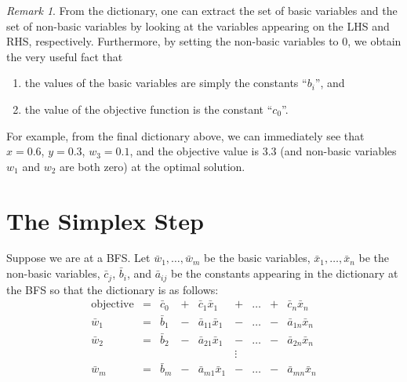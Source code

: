 \documentclass[
]{book}
\providecommand{\tightlist}{%
  \setlength{\itemsep}{0pt}\setlength{\parskip}{0pt}}
\theoremstyle{definition}
\theoremstyle{definition}
\theoremstyle{definition}
\theoremstyle{definition}
\theoremstyle{remark}
\newtheorem*{remark}{Remark}
\begin{document}
\begin{remark}
From the dictionary, one can extract the set of basic variables and the set of non-basic variables by looking at the variables appearing on the LHS and RHS, respectively. Furthermore, by setting the non-basic variables to 0, we obtain the very useful fact that

\begin{enumerate}
\def\labelenumi{\arabic{enumi}.}
\tightlist
\item
  the values of the basic variables are simply the constants ``\(b_i\)'', and
\item
  the value of the objective function is the constant ``\(c_0\)''.
\end{enumerate}

For example, from the final dictionary above, we can immediately see that \(x = 0.6\), \(y = 0.3\), \(w_3 = 0.1\), and the objective value is \(3.3%
\) (and non-basic variables \(w_1\) and \(w_2\) are both zero) at the optimal solution.
\end{remark}

\hypertarget{the-simplex-step}{%
\section{The Simplex Step}\label{the-simplex-step}}

Suppose we are at a BFS.
Let \(\bar{w}_1, \dots, \bar{w}_m\) be the basic variables, \(\bar{x}_1, \dots, \bar{x}_n\) be the non-basic variables, \(\bar{c}_j\), \(\bar{b}_i\), and \(\bar{a}_{ij}\) be the constants appearing in the dictionary at the BFS so that the dictionary is as follows:
\begin{equation}
  \begin{array}{rrrrrrrrrr}
  \mbox{objective} & = & \bar{c}_0 & + & \bar{c}_1\bar{x}_1 & + & \dots & + & \bar{c}_n\bar{x}_n \\
      \bar{w}_1 & = & \bar{b}_1 & - & \bar{a}_{11} \bar{x}_1 & - & \dots & - & \bar{a}_{1n} \bar{x}_n \\
      \bar{w}_2 & = & \bar{b}_2 & - & \bar{a}_{21} \bar{x}_1 & - & \dots & - & \bar{a}_{2n} \bar{x}_n \\
      & & & & & \vdots &  \\
      \bar{w}_m & = & \bar{b}_m & - & \bar{a}_{m1} \bar{x}_1 & - & \dots & - & \bar{a}_{mn} \bar{x}_n 
  \end{array} 
  \label{eq:standard-dictionary}
\end{equation}
\end{document}
